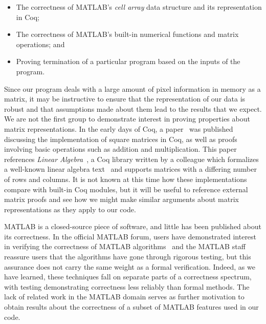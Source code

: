 \documentclass[11pt,conference]{IEEEtran}
\begin{document}
\begin{itemize}
    \item The correctness of MATLAB's \textit{cell array} data structure and its
        representation in Coq;
    \item The correctness of MATLAB's built-in numerical functions and matrix
        operations; and
    \item Proving termination of a particular program based on the inputs of the
        program.
\end{itemize}

Since our program deals with a large amount of pixel information in memory as a
matrix, it may be instructive to ensure that the representation of our data is
robust and that assumptions made about them lead to the results that we expect.
We are not the first group to demonstrate interest in proving properties about
matrix representations. In the early days of Coq, a
paper~\cite{magaud:hal-00955444} was published discussing the implementation of
square matrices in Coq, as well as proofs involving basic operations such as
addition and multiplication. This paper references \textit{Linear
Algebra}~\cite{lin_alg}, a Coq library written by a colleague which formalizes
a well-known linear algebra text~\cite{linear_algebra} and supports matrices with
a differing number of rows and columns. It is not known at this time how these
implementations compare with built-in Coq modules, but it will be useful to
reference external matrix proofs and see how we might make similar arguments
about matrix representations as they apply to our code.

MATLAB is a closed-source piece of software, and little has been published about
its correctness. In the official MATLAB forum, users have demonstrated interest
in verifying the correctness of MATLAB algorithms~\cite{duenisch_2013} and the
MATLAB staff reassure users that the algorithms have gone through rigorous
testing, but this assurance does not carry the same weight as a formal
verification. Indeed, as we have learned, these techniques fall on separate
parts of a correctness spectrum, with testing demonstrating correctness less
reliably than formal methods. The lack of related work in the MATLAB domain
serves as further motivation to obtain results about the correctness of a subset
of MATLAB features used in our code.
\end{document}
